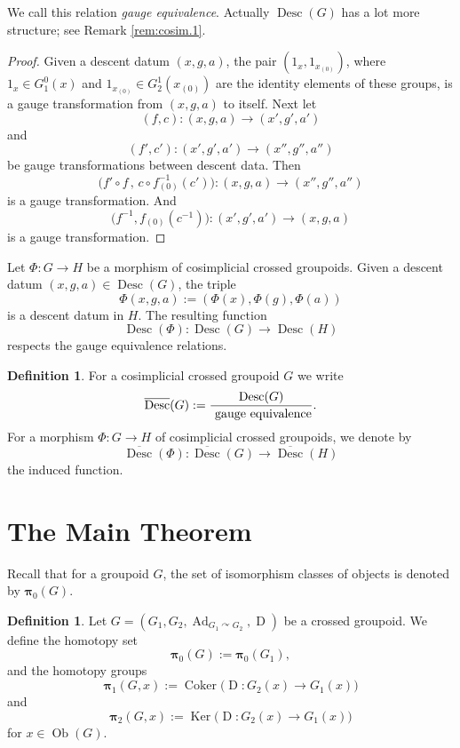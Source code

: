 \documentclass[a4paper,10pt]{amsart}
\theoremstyle{definition}
\newtheorem{dfn}[equation]{Definition}
\numberwithin{equation}{section}
\newcommand{\opn}{\operatorname}
\newcommand{\ol}{\overline}
\newcommand{\tup}[1]{\textup{#1}}
\newcommand{\bsym}[1]{\boldsymbol{#1}}
\newcommand{\crvar}{\curvearrowright}
\begin{document}
We call this relation {\em gauge equivalence}.
Actually $\opn{Desc}(G)$ has a lot more structure; see Remark \ref{rem:cosim.1}.

\begin{proof}
Given a descent datum $(x, g, a)$, the pair 
$(1_x, 1_{x_{(0)}})$, where $1_x \in G^0_1(x)$ and 
$1_{x_{(0)}} \in G^1_2(x_{(0)})$ are the identity elements of these groups,
is a gauge transformation from 
$(x, g, a)$ to itself. Next let
\[ (f, c) : (x, g, a) \to (x', g', a') \]
and
\[ (f', c') : (x', g', a') \to (x'', g'', a'') \]
be gauge transformations between descent data. Then 
\[ \bigl( f' \circ f \, , \, c \circ f_{(0)}^{-1}(c') \bigr) : (x, g, a) \to
(x'', g'', a'') \]
is a gauge transformation. And 
\[ \bigl( f^{-1}, f_{(0)}(c^{-1}) \bigr) : (x', g', a') \to (x, g, a) \]
is a gauge transformation. 
\end{proof}

Let $\Phi : G \to H$ be a morphism of cosimplicial
crossed groupoids. Given a descent datum 
$(x, g, a) \in \opn{Desc}(G)$, the triple 
\[ \Phi(x, g, a) := (\Phi(x), \Phi(g), \Phi(a)) \] 
is a descent datum in $H$. The resulting function 
\[ \opn{Desc}(\Phi) : \opn{Desc}(G) \to \opn{Desc}(H)  \]
respects the gauge equivalence relations. 

\begin{dfn} \label{dfn:cosim.1}
For a cosimplicial crossed groupoid $G$ we write
\[ \ol{\opn{Desc}}(G) :=
\frac{ \opn{Desc}(G) } {\tup{ gauge equivalence}} . \]
For a morphism $\Phi : G \to H$
of cosimplicial crossed groupoids, we denote by 
\[ \ol{\opn{Desc}}(\Phi) : \ol{\opn{Desc}}(G) \to
\ol{\opn{Desc}}(H) \]
the induced function. 
\end{dfn}






\section{The Main Theorem}
\label{sec:equiv-cosim}

Recall that for a groupoid $G$, the set of isomorphism classes of objects
is denoted by $\bsym{\bsym{\pi}}_0(G)$.

\begin{dfn} \label{dfn:equiv-cosim.101}
Let 
$G = 
( G_1, G_2, 
\opn{Ad}_{G_1 \crvar G_{2}}, \opn{D} )$
be a crossed groupoid. 
We define the homotopy set
\[ \bsym{\bsym{\pi}}_0(G) := \bsym{\bsym{\pi}}_0(G_1) , \]
and the homotopy groups
\[ \bsym{\bsym{\pi}}_1(G, x) := 
\opn{Coker} \bigl( \opn{D} : G_2(x) \to G_1(x) \bigr) \]
and
\[ \bsym{\bsym{\pi}}_2(G, x) := 
\opn{Ker} \bigl( \opn{D} : G_2(x) \to G_1(x) \bigr) \]
for $x \in \opn{Ob}(G)$.
\end{dfn}
\end{document}
